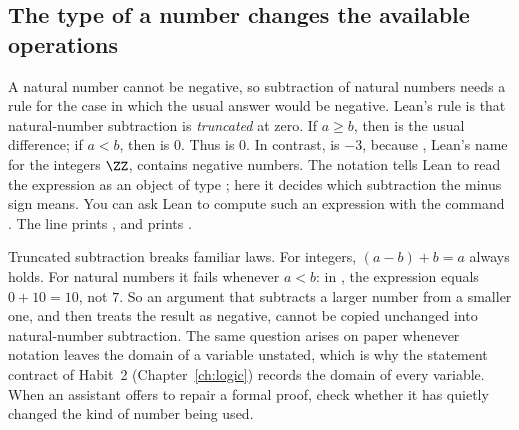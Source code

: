 \subsection*{The type of a number changes the available operations}
A natural number cannot be negative, so subtraction of natural numbers needs a rule for the case in which the usual answer would be negative. Lean's rule is that natural-number subtraction is \emph{truncated} at zero. If $a\ge b$, then  is the usual difference; if $a<b$, then  is $0$. Thus  is $0$. In contrast,  is $-3$, because , Lean's name for the integers $\ZZ$, contains negative numbers. The notation  tells Lean to read the expression  as an object of type ; here it decides which subtraction the minus sign means. You can ask Lean to compute such an expression with the command . The line  prints , and  prints .

Truncated subtraction breaks familiar laws. For integers, $(a-b)+b=a$ always holds. For natural numbers it fails whenever $a<b$: in , the expression  equals $0+10=10$, not $7$. So an argument that subtracts a larger number from a smaller one, and then treats the result as negative, cannot be copied unchanged into natural-number subtraction. The same question arises on paper whenever notation leaves the domain of a variable unstated, which is why the statement contract of Habit~2 (Chapter~\ref{ch:logic}) records the domain of every variable. When an assistant offers to repair a formal proof, check whether it has quietly changed the kind of number being used.
